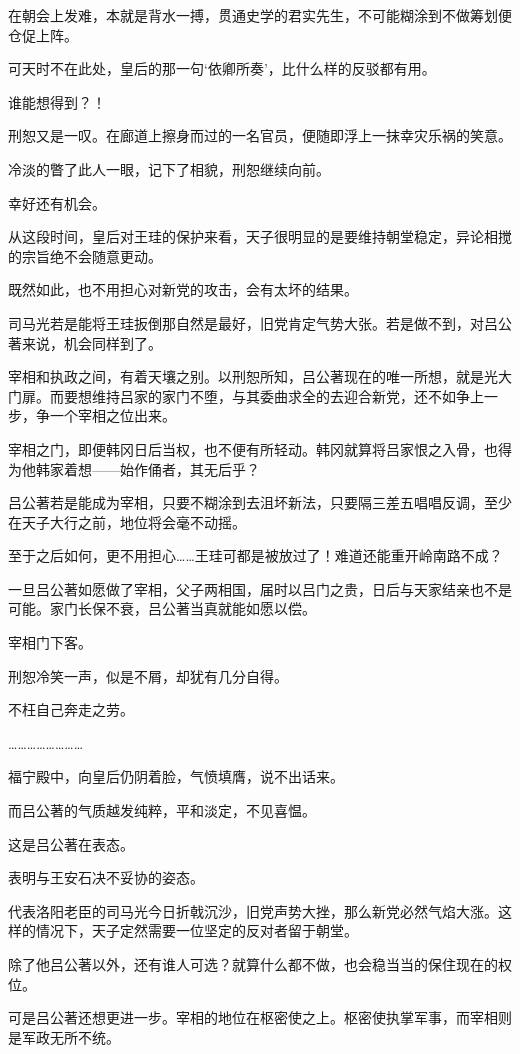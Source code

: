 在朝会上发难，本就是背水一搏，贯通史学的君实先生，不可能糊涂到不做筹划便仓促上阵。

可天时不在此处，皇后的那一句‘依卿所奏’，比什么样的反驳都有用。

谁能想得到？！

刑恕又是一叹。在廊道上擦身而过的一名官员，便随即浮上一抹幸灾乐祸的笑意。

冷淡的瞥了此人一眼，记下了相貌，刑恕继续向前。

幸好还有机会。

从这段时间，皇后对王珪的保护来看，天子很明显的是要维持朝堂稳定，异论相搅的宗旨绝不会随意更动。

既然如此，也不用担心对新党的攻击，会有太坏的结果。

司马光若是能将王珪扳倒那自然是最好，旧党肯定气势大张。若是做不到，对吕公著来说，机会同样到了。

宰相和执政之间，有着天壤之别。以刑恕所知，吕公著现在的唯一所想，就是光大门扉。而要想维持吕家的家门不堕，与其委曲求全的去迎合新党，还不如争上一步，争一个宰相之位出来。

宰相之门，即便韩冈日后当权，也不便有所轻动。韩冈就算将吕家恨之入骨，也得为他韩家着想——始作俑者，其无后乎？

吕公著若是能成为宰相，只要不糊涂到去沮坏新法，只要隔三差五唱唱反调，至少在天子大行之前，地位将会毫不动摇。

至于之后如何，更不用担心……王珪可都是被放过了！难道还能重开岭南路不成？

一旦吕公著如愿做了宰相，父子两相国，届时以吕门之贵，日后与天家结亲也不是可能。家门长保不衰，吕公著当真就能如愿以偿。

宰相门下客。

刑恕冷笑一声，似是不屑，却犹有几分自得。

不枉自己奔走之劳。

……………………

福宁殿中，向皇后仍阴着脸，气愤填膺，说不出话来。

而吕公著的气质越发纯粹，平和淡定，不见喜愠。

这是吕公著在表态。

表明与王安石决不妥协的姿态。

代表洛阳老臣的司马光今日折戟沉沙，旧党声势大挫，那么新党必然气焰大涨。这样的情况下，天子定然需要一位坚定的反对者留于朝堂。

除了他吕公著以外，还有谁人可选？就算什么都不做，也会稳当当的保住现在的权位。

可是吕公著还想更进一步。宰相的地位在枢密使之上。枢密使执掌军事，而宰相则是军政无所不统。

